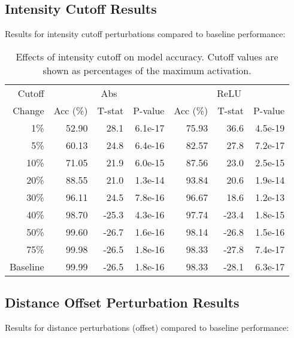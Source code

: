 \subsection{Intensity Cutoff Results}

Results for intensity cutoff perturbations compared to baseline performance:

\begin{table}[H]
\centering
\begin{tabular}{r|rrr|rrr}
Cutoff & \multicolumn{3}{|c|}{Abs} & \multicolumn{3}{|c}{ReLU} \\
Change & Acc (\%) & T-stat & P-value & Acc (\%) & T-stat & P-value \\
\hline
1\% & 52.90 & 28.1 & 6.1e-17 & 75.93 & 36.6 & 4.5e-19 \\
5\% & 60.13 & 24.8 & 6.4e-16 & 82.57 & 27.8 & 7.2e-17 \\
10\% & 71.05 & 21.9 & 6.0e-15 & 87.56 & 23.0 & 2.5e-15 \\
20\% & 88.55 & 21.0 & 1.3e-14 & 93.84 & 20.6 & 1.9e-14 \\
30\% & 96.11 & 24.5 & 7.8e-16 & 96.67 & 18.6 & 1.2e-13 \\
40\% & 98.70 & -25.3 & 4.3e-16 & 97.74 & -23.4 & 1.8e-15 \\
50\% & 99.60 & -26.7 & 1.6e-16 & 98.14 & -26.8 & 1.5e-16 \\
75\% & 99.98 & -26.5 & 1.8e-16 & 98.33 & -27.8 & 7.4e-17 \\
Baseline & 99.99 & -26.5 & 1.8e-16 & 98.33 & -28.1 & 6.3e-17 \\
\end{tabular}
\caption{Effects of intensity cutoff on model accuracy. Cutoff values are shown as percentages of the maximum activation.}
\label{tab:stat_cutoff}
\end{table}

\subsection{Distance Offset Perturbation Results}

Results for distance perturbations (offset) compared to baseline performance:

